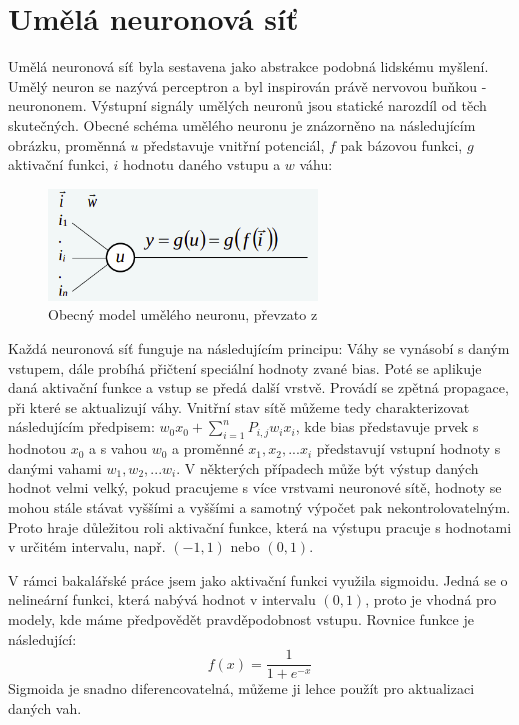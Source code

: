 \section{Umělá neuronová síť}
Umělá neuronová síť byla sestavena jako abstrakce podobná lidskému myšlení. Umělý neuron se nazývá perceptron a byl inspirován právě nervovou buňkou - neurononem. Výstupní signály umělých neuronů jsou statické narozdíl od těch skutečných. Obecné schéma umělého neuronu je znázorněno na následujícím obrázku, proměnná $u$ představuje vnitřní potenciál, $f$ pak bázovou funkci, $g$ aktivační funkci, $i$ hodnotu daného vstupu a $w$ váhu:

\begin{figure}[!htbp]
    \centering
    \includegraphics[width=270px]{obrazky-figures/neuron.png}
    \caption{Obecný model umělého neuronu, převzato z \cite{PrednaskaIZU9}}
\end{figure}

Každá neuronová síť funguje na následujícím principu: Váhy se vynásobí s daným vstupem, dále probíhá přičtení speciální hodnoty zvané bias. Poté se aplikuje daná aktivační funkce a vstup se předá další vrstvě. Provádí se zpětná propagace, při které se aktualizují váhy. Vnitřní stav sítě můžeme tedy charakterizovat následujícím předpisem: $w_0x_0 + \sum_{i=1}^{n}P_{i,j}w_ix_i$, kde bias představuje prvek s hodnotou $x_0$ a s vahou $w_0$ a proměnné $x_1, x_2, ...x_i$ představují vstupní hodnoty s danými vahami $w_1, w_2, ...w_i$. V některých případech může být výstup daných hodnot velmi velký, pokud pracujeme s více vrstvami neuronové sítě, hodnoty se mohou stále stávat vyššími a vyššími a samotný výpočet pak nekontrolovatelným. Proto hraje důležitou roli aktivační funkce, která na výstupu pracuje s hodnotami v určitém intervalu, např. $(-1, 1)$ nebo $(0, 1)$.\cite{MediumDeepLearning} 

V rámci bakalářské práce jsem jako aktivační funkci využila sigmoidu. Jedná se o nelineární funkci, která nabývá hodnot v intervalu $(0, 1)$, proto je vhodná pro modely, kde máme předpovědět pravděpodobnost vstupu. Rovnice funkce je následující:
$$f(x)=\frac{1}{1+e^{-x}}$$
Sigmoida je snadno diferencovatelná, můžeme ji lehce použít pro aktualizaci daných vah.

